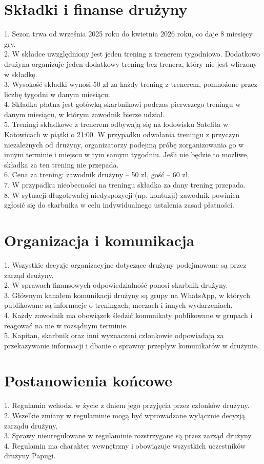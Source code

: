 \documentclass[12pt,a4paper]{article}
\begin{document}
\section{Składki i finanse drużyny}
1. Sezon trwa od września 2025 roku do kwietnia 2026 roku, co daje 8 miesięcy gry.\\
2. W składce uwzględniony jest jeden trening z trenerem tygodniowo. Dodatkowo drużyna organizuje jeden dodatkowy trening bez trenera, który nie jest wliczony w składkę.\\
3. Wysokość składki wynosi 50 zł za każdy trening z trenerem, pomnożone przez liczbę tygodni w danym miesiącu.\\
4. Składka płatna jest gotówką skarbnikowi podczas pierwszego treningu w danym miesiącu, w którym zawodnik bierze udział.\\
5. Treningi składkowe z trenerem odbywają się na lodowisku Satelita w Katowicach w piątki o 21:00. W przypadku odwołania treningu z przyczyn niezależnych od drużyny, organizatorzy podejmą próbę zorganizowania go w innym terminie i miejscu w tym samym tygodniu. Jeśli nie będzie to możliwe, składka za ten trening nie przepada.\\
6. Cena za trening: zawodnik drużyny -- 50 zł, gość -- 60 zł.\\
7. W przypadku nieobecności na treningu składka za dany trening przepada.\\
8. W sytuacji długotrwałej niedyspozycji (np. kontuzji) zawodnik powinien zgłosić się do skarbnika w celu indywidualnego ustalenia zasad płatności.

\section{Organizacja i komunikacja}
1. Wszystkie decyzje organizacyjne dotyczące drużyny podejmowane są przez zarząd drużyny.\\
2. W sprawach finansowych odpowiedzialność ponosi skarbnik drużyny.\\
3. Głównym kanałem komunikacji drużyny są grupy na WhatsApp, w których publikowane są informacje o treningach, meczach i innych wydarzeniach.\\
4. Każdy zawodnik ma obowiązek śledzić komunikaty publikowane w grupach i reagować na nie w rozsądnym terminie.\\
5. Kapitan, skarbnik oraz inni wyznaczeni członkowie odpowiadają za przekazywanie informacji i dbanie o sprawny przepływ komunikatów w drużynie.

\section{Postanowienia końcowe}
1. Regulamin wchodzi w życie z dniem jego przyjęcia przez członków drużyny.\\
2. Wszelkie zmiany w regulaminie mogą być wprowadzane wyłącznie decyzją zarządu drużyny.\\
3. Sprawy nieuregulowane w regulaminie rozstrzygane są przez zarząd drużyny.\\
4. Regulamin ma charakter wewnętrzny i obowiązuje wszystkich uczestników drużyny Papugi.
\end{document}
